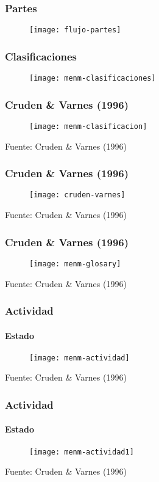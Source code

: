 \documentclass[12pt]{beamer}
\begin{document}
\begin{frame}
\frametitle{Partes}
\begin{figure}
\centering
\texttt{[image: flujo-partes]} 
\end{figure}
\end{frame}
\begin{frame}
\frametitle{Clasificaciones}
\begin{figure}
\centering
\texttt{[image: menm-clasificaciones]} 
\end{figure}
\end{frame}
\begin{frame}
\frametitle{Cruden \& Varnes (1996)}
\begin{figure}
\centering
\texttt{[image: menm-clasificacion]} 
\end{figure}
\tiny{Fuente: Cruden \& Varnes (1996)}
\end{frame}
\begin{frame}
\frametitle{Cruden \& Varnes (1996)}
\begin{figure}
\centering
\texttt{[image: cruden-varnes]} 
\end{figure}
\tiny{Fuente: Cruden \& Varnes (1996)}
\end{frame}
\begin{frame}
\frametitle{Cruden \& Varnes (1996)}
\begin{figure}
\centering
\texttt{[image: menm-glosary]} 
\end{figure}
\tiny{Fuente: Cruden \& Varnes (1996)}
\end{frame}
\begin{frame}
\frametitle{Actividad}
\framesubtitle{Estado}
\begin{figure}
\centering
\texttt{[image: menm-actividad]} 
\end{figure}
\tiny{Fuente: Cruden \& Varnes (1996)}
\end{frame}
\begin{frame}
\frametitle{Actividad}
\framesubtitle{Estado}
\begin{figure}
\centering
\texttt{[image: menm-actividad1]} 
\end{figure}
\tiny{Fuente: Cruden \& Varnes (1996)}
\end{frame}
\end{document}
